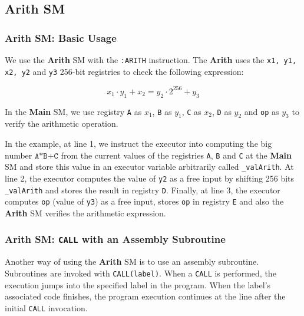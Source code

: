 


\subsection{Arith SM}

\subsubsection{Arith SM: Basic Usage}

We use the \textbf{Arith} SM with the \texttt{:ARITH} instruction. The \textbf{Arith} uses the \texttt{x1, y1, x2, y2} and \texttt{y3} 256-bit registries to check the following expression:

\[
x_1 \cdot y_1 + x_2 = y_2 \cdot 2^{256} + y_3
\]

In the \textbf{Main} SM, we use registry \texttt{A} as $x_1$, \texttt{B} as $y_1$, \texttt{C} as $x_2$, \texttt{D} as $y_2$ and \texttt{op} as $y_3$ to verify the arithmetic operation.



In the example, at line 1, we instruct the executor into computing the big number $\texttt{A*B+C}$ from the current values of the registries \texttt{A}, \texttt{B} and \texttt{C} at the \textbf{Main} SM and store this value in an executor variable arbitrarily called \texttt{\_valArith}. At line 2, the executor computes the value of \texttt{y2} as a free input by shifting 256 bits \texttt{\_valArith} and stores the result in registry \texttt{D}. Finally, at line 3, the executor computes \texttt{op} (value of \texttt{y3}) as a free input, 
stores \texttt{op} in registry \texttt{E} and also the \textbf{Arith} SM verifies the arithmetic expression.


\subsubsection{Arith SM: \texttt{CALL} with an Assembly Subroutine}

Another way of using the \textbf{Arith} SM is to use an assembly subroutine. Subroutines are invoked with \texttt{CALL(label)}. When a \texttt{CALL} is performed, the execution jumps into the specified label in the program. When the label's associated code finishes, the program execution continues at the line after the initial \texttt{CALL} invocation.


